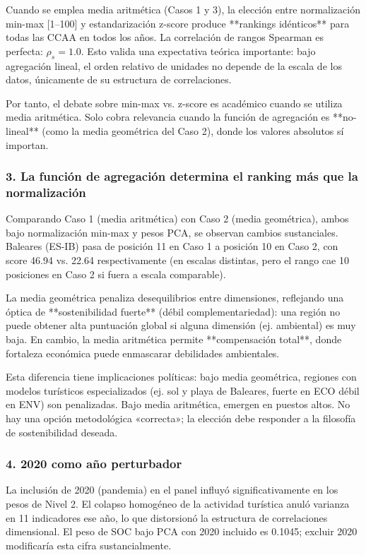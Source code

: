 Cuando se emplea media aritmética (Casos 1 y 3), la elección entre normalización min-max [1--100] y estandarización z-score produce **rankings idénticos** para todas las CCAA en todos los años. La correlación de rangos Spearman es perfecta: $\rho_s = 1.0$. Esto valida una expectativa teórica importante: bajo agregación lineal, el orden relativo de unidades no depende de la escala de los datos, únicamente de su estructura de correlaciones.

Por tanto, el debate sobre min-max vs. z-score es académico cuando se utiliza media aritmética. Solo cobra relevancia cuando la función de agregación es **no-lineal** (como la media geométrica del Caso 2), donde los valores absolutos sí importan.

\subsubsection{3. La función de agregación determina el ranking más que la normalización}

Comparando Caso 1 (media aritmética) con Caso 2 (media geométrica), ambos bajo normalización min-max y pesos PCA, se observan cambios sustanciales. Baleares (ES-IB) pasa de posición 11 en Caso 1 a posición 10 en Caso 2, con score 46.94 vs. 22.64 respectivamente (en escalas distintas, pero el rango cae 10 posiciones en Caso 2 si fuera a escala comparable).

La media geométrica penaliza desequilibrios entre dimensiones, reflejando una óptica de **sostenibilidad fuerte** (débil complementariedad): una región no puede obtener alta puntuación global si alguna dimensión (ej. ambiental) es muy baja. En cambio, la media aritmética permite **compensación total**, donde fortaleza económica puede enmascarar debilidades ambientales.

Esta diferencia tiene implicaciones políticas: bajo media geométrica, regiones con modelos turísticos especializados (ej. sol y playa de Baleares, fuerte en ECO débil en ENV) son penalizadas. Bajo media aritmética, emergen en puestos altos. No hay una opción metodológica «correcta»; la elección debe responder a la filosofía de sostenibilidad deseada.

\subsubsection{4. 2020 como año perturbador}

La inclusión de 2020 (pandemia) en el panel influyó significativamente en los pesos de Nivel 2. El colapso homogéneo de la actividad turística anuló varianza en 11 indicadores ese año, lo que distorsionó la estructura de correlaciones dimensional. El peso de SOC bajo PCA con 2020 incluido es 0.1045; excluir 2020 modificaría esta cifra sustancialmente.

